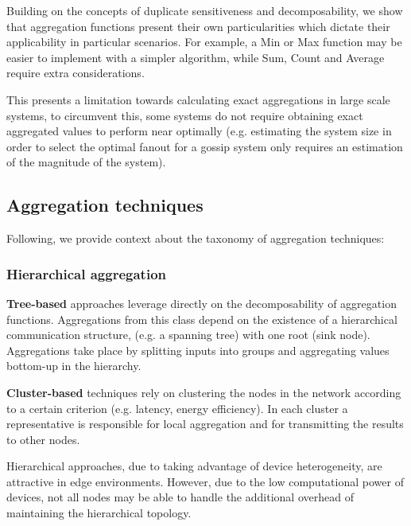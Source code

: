Building on the concepts of duplicate sensitiveness and decomposability, we show that aggregation functions present their own particularities which dictate their applicability in particular scenarios. For example, a Min or Max function may be easier to implement with a simpler algorithm, while Sum, Count and Average require extra considerations. 

This presents a limitation towards calculating exact aggregations in large scale systems, to circumvent this, some systems do not require obtaining exact aggregated values to perform near optimally (e.g. estimating the system size in order to select the optimal fanout for a gossip system only requires an estimation of the magnitude of the system). 

\subsection{Aggregation techniques}

Following, we provide context about the taxonomy of aggregation techniques:

\subsubsection*{Hierarchical aggregation}

\textbf{Tree-based} approaches leverage directly on the decomposability of aggregation functions. Aggregations from this class depend on the existence of a hierarchical communication structure, (e.g. a spanning tree) with one root (sink node). Aggregations take place by splitting inputs into groups and aggregating values bottom-up in the hierarchy. 


\textbf{Cluster-based} techniques rely on clustering the nodes in the network according to a certain criterion (e.g. latency, energy efficiency). In each cluster a representative is responsible for local aggregation and for transmitting the results to other nodes. 

Hierarchical approaches, due to taking advantage of device heterogeneity, are attractive in edge environments. However, due to the low computational power of devices, not all nodes may be able to handle the additional overhead of maintaining the hierarchical topology.


